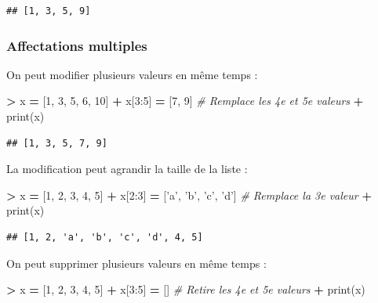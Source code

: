 \documentclass[12pt,]{book}
\newenvironment{Shaded}{\begin{snugshade}}{\end{snugshade}}
\newcommand{\DecValTok}[1]{\textcolor[rgb]{0.00,0.00,0.81}{#1}}
\newcommand{\StringTok}[1]{\textcolor[rgb]{0.31,0.60,0.02}{#1}}
\newcommand{\CommentTok}[1]{\textcolor[rgb]{0.56,0.35,0.01}{\textit{#1}}}
\newcommand{\OperatorTok}[1]{\textcolor[rgb]{0.81,0.36,0.00}{\textbf{#1}}}
\newcommand{\BuiltInTok}[1]{#1}
\newcommand{\NormalTok}[1]{#1}
\numberwithin{equation}{section}
\numberwithin{countremarque}{section}
\begin{document}
\begin{lstlisting}
## [1, 3, 5, 9]
\end{lstlisting}

\subsubsection{Affectations multiples}\label{affectations-multiples}

On peut modifier plusieurs valeurs en même temps :

\begin{Shaded}
\begin{Highlighting}[]
\OperatorTok{>}\NormalTok{ x }\OperatorTok{=}\NormalTok{ [}\DecValTok{1}\NormalTok{, }\DecValTok{3}\NormalTok{, }\DecValTok{5}\NormalTok{, }\DecValTok{6}\NormalTok{, }\DecValTok{10}\NormalTok{]}
\OperatorTok{+}\NormalTok{ x[}\DecValTok{3}\NormalTok{:}\DecValTok{5}\NormalTok{] }\OperatorTok{=}\NormalTok{ [}\DecValTok{7}\NormalTok{, }\DecValTok{9}\NormalTok{] }\CommentTok{# Remplace les 4e et 5e valeurs}
\OperatorTok{+} \BuiltInTok{print}\NormalTok{(x)}
\end{Highlighting}
\end{Shaded}

\begin{lstlisting}
## [1, 3, 5, 7, 9]
\end{lstlisting}

La modification peut agrandir la taille de la liste :

\begin{Shaded}
\begin{Highlighting}[]
\OperatorTok{>}\NormalTok{ x }\OperatorTok{=}\NormalTok{ [}\DecValTok{1}\NormalTok{, }\DecValTok{2}\NormalTok{, }\DecValTok{3}\NormalTok{, }\DecValTok{4}\NormalTok{, }\DecValTok{5}\NormalTok{]}
\OperatorTok{+}\NormalTok{ x[}\DecValTok{2}\NormalTok{:}\DecValTok{3}\NormalTok{] }\OperatorTok{=}\NormalTok{ [}\StringTok{'a'}\NormalTok{, }\StringTok{'b'}\NormalTok{, }\StringTok{'c'}\NormalTok{, }\StringTok{'d'}\NormalTok{] }\CommentTok{# Remplace la 3e valeur}
\OperatorTok{+} \BuiltInTok{print}\NormalTok{(x)}
\end{Highlighting}
\end{Shaded}

\begin{lstlisting}
## [1, 2, 'a', 'b', 'c', 'd', 4, 5]
\end{lstlisting}

On peut supprimer plusieurs valeurs en même temps :

\begin{Shaded}
\begin{Highlighting}[]
\OperatorTok{>}\NormalTok{ x }\OperatorTok{=}\NormalTok{ [}\DecValTok{1}\NormalTok{, }\DecValTok{2}\NormalTok{, }\DecValTok{3}\NormalTok{, }\DecValTok{4}\NormalTok{, }\DecValTok{5}\NormalTok{]}
\OperatorTok{+}\NormalTok{ x[}\DecValTok{3}\NormalTok{:}\DecValTok{5}\NormalTok{] }\OperatorTok{=}\NormalTok{ [] }\CommentTok{# Retire les 4e et 5e valeurs}
\OperatorTok{+} \BuiltInTok{print}\NormalTok{(x)}
\end{Highlighting}
\end{Shaded}
\end{document}
